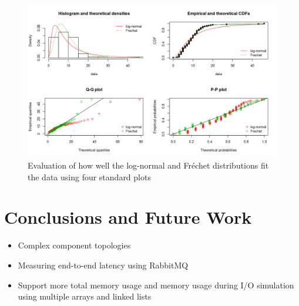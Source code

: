 \documentclass{article}
\begin{document}
\begin{figure}
  \centering
  \includegraphics[width=\textwidth]{../plots/cpu_time_distributions.png}
  \caption{Evaluation of how well the log-normal and Fr\'{e}chet distributions fit
    the data using four standard plots}
  \label{fig:frechet_fit}
\end{figure}

\section{Conclusions and Future Work}

\begin{itemize}
\item Complex component topologies
\item Measuring end-to-end latency using RabbitMQ
\item Support more total memory usage and memory usage during I/O simulation
  using multiple arrays and linked lists
\end{itemize}



\end{document}
